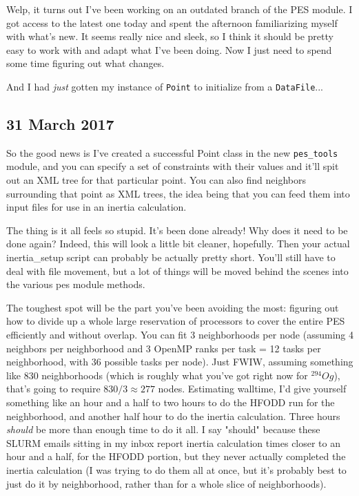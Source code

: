 \documentclass[]{report}
\begin{document}
Welp, it turns out I've been working on an outdated branch of the PES module. I got access to the latest one today and spent the afternoon familiarizing myself with what's new. It seems really nice and sleek, so I think it should be pretty easy to work with and adapt what I've been doing. Now I just need to spend some time figuring out what changes.

And I had \textit{just} gotten my instance of \texttt{Point} to initialize from a \texttt{DataFile}...

\subsection*{31 March 2017}

So the good news is I've created a successful Point class in the new \texttt{pes\_tools} module, and you can specify a set of constraints with their values and it'll spit out an XML tree for that particular point. You can also find neighbors surrounding that point as XML trees, the idea being that you can feed them into input files for use in an inertia calculation.

The thing is it all feels so stupid. It's been done already! Why does it need to be done again? Indeed, this will look a little bit cleaner, hopefully. Then your actual inertia\_setup script can probably be actually pretty short. You'll still have to deal with file movement, but a lot of things will be moved behind the scenes into the various pes module methods.

The toughest spot will be the part you've been avoiding the most: figuring out how to divide up a whole large reservation of processors to cover the entire PES efficiently and without overlap. You can fit 3 neighborhoods per node (assuming 4 neighbors per neighborhood and 3 OpenMP ranks per task = 12 tasks per neighborhood, with 36 possible tasks per node). Just FWIW, assuming something like 830 neighborhoods (which is roughly what you've got right now for $^{294}Og$), that's going to require $830/3 \approx 277$ nodes. Estimating walltime, I'd give yourself something like an hour and a half to two hours to do the HFODD run for the neighborhood, and another half hour to do the inertia calculation. Three hours \textit{should} be more than enough time to do it all. I say "should" because these SLURM emails sitting in my inbox report inertia calculation times closer to an hour and a half, for the HFODD portion, but they never actually completed the inertia calculation (I was trying to do them all at once, but it's probably best to just do it by neighborhood, rather than for a whole slice of neighborhoods).
\end{document}
